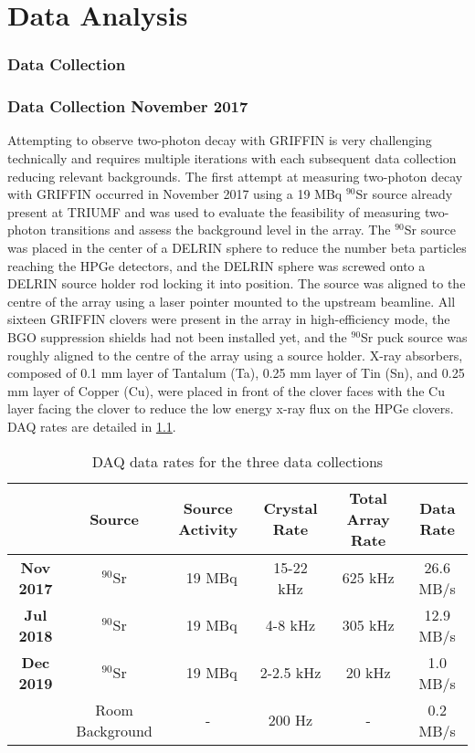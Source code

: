 \documentclass[cnatzke_thesis_proposal.tex]{subfiles}
\begin{document}
\chapter{Data Analysis}

\subsection{Data Collection}
\subsection{Data Collection November 2017}
Attempting to observe two-photon decay with GRIFFIN is very challenging technically and requires multiple iterations with each subsequent data collection reducing relevant backgrounds. 
The first attempt at measuring two-photon decay with GRIFFIN occurred in November 2017 using a 19 MBq $^{90}$Sr source already present at TRIUMF and was used to evaluate the feasibility of measuring two-photon transitions and assess the background level in the array. 
The $^{90}$Sr source was placed in the center of a DELRIN sphere to reduce the number beta particles reaching the HPGe detectors, and the DELRIN sphere was screwed onto a DELRIN source holder rod locking it into position. 
The source was aligned to the centre of the array using a laser pointer mounted to the upstream beamline.  
All sixteen GRIFFIN clovers were present in the array in high-efficiency mode, the BGO suppression shields had not been installed yet, and the $^{90}$Sr puck source was roughly aligned to the centre of the array using a source holder. 
X-ray absorbers, composed of 0.1 mm layer of Tantalum (Ta), 0.25 mm layer of Tin (Sn), and 0.25 mm layer of Copper (Cu), were placed in front of the clover faces with the Cu layer facing the clover to reduce the low energy x-ray flux on the HPGe clovers. 
DAQ rates are detailed in \ref{tab:daq_rates}.

\begin{table}[]
  \centering
  \begin{tabular}{cccccc}
                    & Source          & Source Activity & Crystal Rate & Total Array Rate & Data Rate \\ \hline
  \textbf{Nov 2017} & $^{90}$Sr       & ~19 MBq         & 15-22 kHz    & 625 kHz          & 26.6 MB/s \\ \hline
  \textbf{Jul 2018} & $^{90}$Sr       & ~19 MBq         & 4-8 kHz      & 305 kHz          & 12.9 MB/s \\ \hline
  \textbf{Dec 2019} & $^{90}$Sr       & ~19 MBq         & 2-2.5 kHz    & 20 kHz           & 1.0 MB/s  \\ 
                    & Room Background & -               & 200 Hz       & -                & 0.2 MB/s  \\ \hline
  \end{tabular}
  \caption{DAQ data rates for the three data collections}
  \label{tab:daq_rates}
\end{table}
\end{document}
